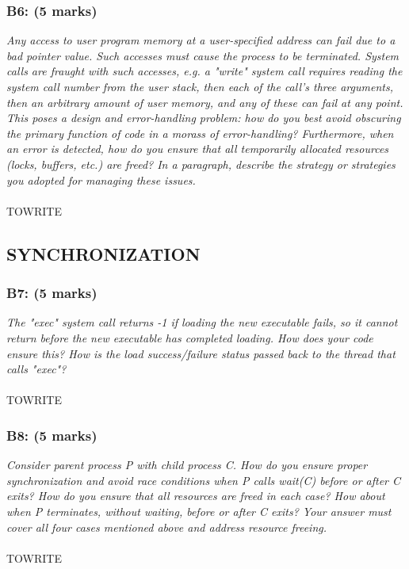 \documentclass{article}
\begin{document}
\subsubsection*{B6: (5 marks) }
\textit{Any access to user program memory at a user-specified address can fail due to
a bad pointer value. Such accesses must cause the process to be terminated.
System calls are fraught with such accesses, e.g. a "write" system call
requires reading the system call number from the user stack, then each of the
call's three arguments, then an arbitrary amount of user memory, and any of
these can fail at any point. This poses a design and error-handling problem:
how do you best avoid obscuring the primary function of code in a morass of
error-handling? Furthermore, when an error is detected, how do you ensure
that all temporarily allocated resources (locks, buffers, etc.) are freed?
In a paragraph, describe the strategy or strategies you adopted for managing
these issues.}
\\ \\ TOWRITE

\subsection{SYNCHRONIZATION}

\subsubsection*{B7: (5 marks) }
\textit{The "exec" system call returns -1 if loading the new executable fails, so it
cannot return before the new executable has completed loading. How does your
code ensure this? How is the load success/failure status passed back to the
thread that calls "exec"?}
\\ \\ TOWRITE

\subsubsection*{B8: (5 marks) }
\textit{Consider parent process P with child process C. How do you ensure proper
synchronization and avoid race conditions when P calls wait(C) before or
after C exits? How do you ensure that all resources are freed in each case?
How about when P terminates, without waiting, before or after C exits? Your
answer must cover all four cases mentioned above and address resource freeing.}
\\ \\TOWRITE
\end{document}
